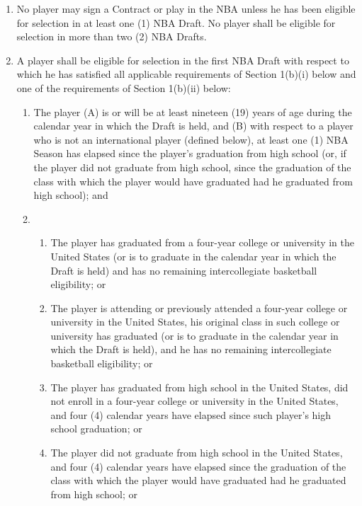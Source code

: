 \documentclass[
]{book}
\providecommand{\tightlist}{%
  \setlength{\itemsep}{0pt}\setlength{\parskip}{0pt}}
\begin{document}
\begin{enumerate}
\def\labelenumi{(\alph{enumi})}
\tightlist
\item
  No player may sign a Contract or play in the NBA unless he has been eligible for selection in at least one (1) NBA Draft. No player shall be eligible for selection in more than two (2) NBA Drafts.
\item
  A player shall be eligible for selection in the first NBA Draft with respect to which he has satisfied all applicable requirements of Section 1(b)(i) below and one of the requirements of Section 1(b)(ii) below:

  \begin{enumerate}
  \def\labelenumii{(\roman{enumii})}
  \item
    The player (A) is or will be at least nineteen (19) years of age during the calendar year in which the Draft is held, and (B) with respect to a player who is not an international player (defined below), at least one (1) NBA Season has elapsed since the player's graduation from high school (or, if the player did not graduate from high school, since the graduation of the class with which the player would have graduated had he graduated from high school); and
  \item
    \begin{enumerate}
    \def\labelenumiii{(\Alph{enumiii})}
    \tightlist
    \item
      The player has graduated from a four-year college or university in the United States (or is to graduate in the calendar year in which the Draft is held) and has no remaining intercollegiate basketball eligibility; or
    \item
      The player is attending or previously attended a four-year college or university in the United States, his original class in such college or university has graduated (or is to graduate in the calendar year in which the Draft is held), and he has no remaining intercollegiate basketball eligibility; or
    \item
      The player has graduated from high school in the United States, did not enroll in a four-year college or university in the United States, and four (4) calendar years have elapsed since such player's high school graduation; or
    \item
      The player did not graduate from high school in the United States, and four (4) calendar years have elapsed since the graduation of the class with which the player would have graduated had he graduated from high school; or

\end{enumerate}
\end{enumerate}
\end{enumerate}
\end{document}
